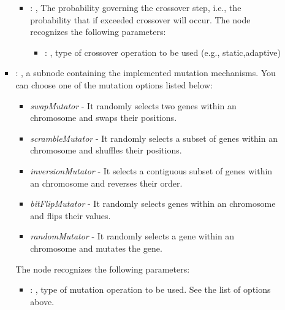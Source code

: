 \begin{itemize}
\begin{itemize}
\begin{itemize}
\begin{itemize}
                \item {}: ,
                  The probability governing the crossover step, i.e., the probability that if
                  exceeded crossover will occur.
                  The  node recognizes the following parameters:
                    \begin{itemize}
                      \item {}: ,
                        type of crossover operation to be used (e.g., static,adaptive)
                  \end{itemize}
              \end{itemize}

            \item {}: ,
              a subnode containing the implemented mutation mechanisms. You can choose one of the
              mutation options listed below:                 \begin{itemize}                   \item
              \textit{swapMutator} - It randomly selects two genes within an chromosome and swaps
              their positions.                   \item \textit{scrambleMutator} - It randomly
              selects a subset of genes within an chromosome and shuffles their positions.
              \item \textit{inversionMutator} - It selects a contiguous subset of genes within an
              chromosome and reverses their order.                   \item \textit{bitFlipMutator} -
              It randomly selects genes within an chromosome and flips their values.
              \item \textit{randomMutator} - It randomly selects a gene within an chromosome and
              mutates the gene.                 \end{itemize}
              The  node recognizes the following parameters:
                \begin{itemize}
                  \item {}: ,
                    type of mutation operation to be used. See the list of options above.
              \end{itemize}


\end{itemize}
\end{itemize}
\end{itemize}
